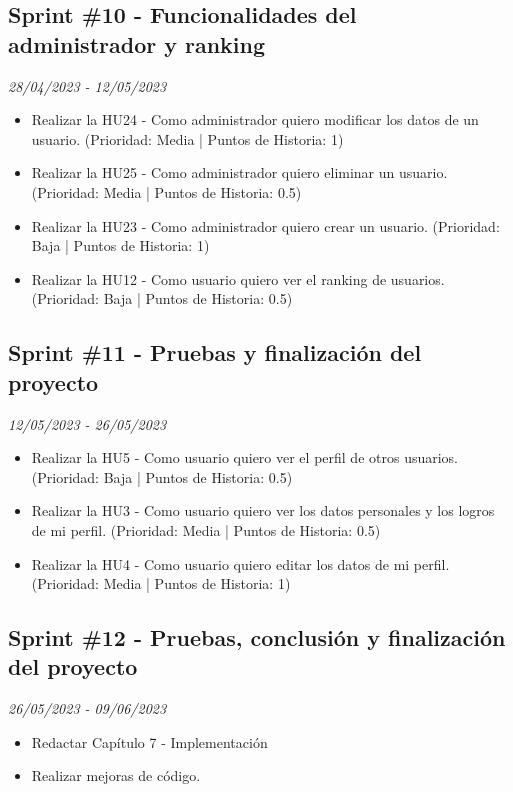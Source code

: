 \subsection{Sprint \#10 - Funcionalidades del administrador y ranking}
\textit{28/04/2023   -   12/05/2023}
\begin{itemize}
\item Realizar la HU24 - Como administrador quiero modificar los datos de un usuario. (Prioridad: Media | Puntos de Historia: 1)
\item Realizar la HU25 - Como administrador quiero eliminar un usuario. (Prioridad: Media | Puntos de Historia: 0.5)
\item Realizar la HU23 - Como administrador quiero crear un usuario. (Prioridad: Baja | Puntos de Historia: 1)
\item Realizar la HU12 - Como usuario quiero ver el ranking de usuarios. (Prioridad: Baja | Puntos de Historia: 0.5)
\end{itemize}

\subsection{Sprint \#11 - Pruebas y finalización del proyecto}
\textit{12/05/2023   -   26/05/2023}
\begin{itemize}
    \item Realizar la HU5 - Como usuario quiero ver el perfil de otros usuarios.  (Prioridad: Baja | Puntos de Historia: 0.5)
    \item Realizar la HU3 - Como usuario quiero ver los datos personales y los logros de mi perfil. (Prioridad: Media | Puntos de Historia: 0.5)
    \item Realizar la HU4 - Como usuario quiero editar los datos de mi perfil. (Prioridad: Media | Puntos de Historia: 1)
    \end{itemize}
    
    \subsection{Sprint \#12 - Pruebas, conclusión y finalización del proyecto}
\textit{26/05/2023   -   09/06/2023}
\begin{itemize}

    \item Redactar Capítulo 7 - Implementación
    \item Realizar mejoras de código.

\end{itemize}
